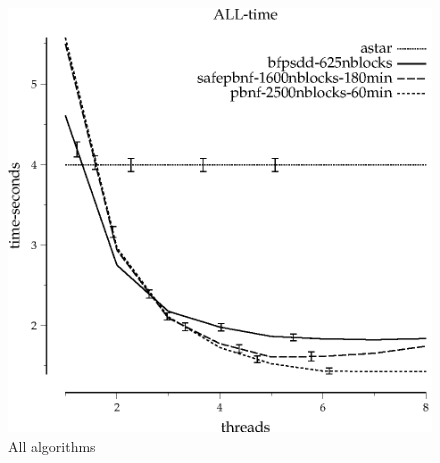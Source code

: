 \documentclass{article}
\begin{document}

\begin{figure}
\begin{center}
\includegraphics{ALL-time}
\end{center}
\caption{All algorithms}
\end{figure}
\end{document}
